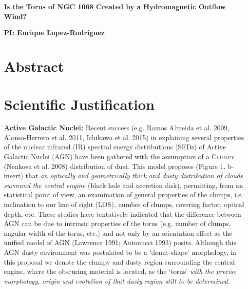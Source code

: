 \documentclass[12pt,a4paper]{article}  %
\begin{document}
\pagestyle{plain}
 

\begin{center}
{\LARGE{\bf
{Is the Torus of NGC 1068 Created by a Hydromagnetic Outflow Wind?}
}}
\end{center}
\bigskip

\centerline{\bf PI: 
{Enrique Lopez-Rodriguez}}

\bigskip


\section{Abstract}




\section{Scientific Justification}

\textbf{Active Galactic Nuclei:} Recent success (e.g. Ramos Almeida et al. 2009, Alonso-Herrero et al. 2011, Ichikawa et al. 2015) in explaining several properties of the nuclear infrared (IR) spectral energy distributions (SEDs) of Active Galactic Nuclei (AGN) have been gathered with the assumption of a \textsc{Clumpy} (Nenkova et al. 2008) distribution of dust. This model proposes (Figure 1, b-insert) that \textit{an optically and geometrically thick and dusty distribution of clouds surround the central engine} (black hole and accretion disk), permitting, from an statistical point of view, an examination of general properties of the clumps, i.e. inclination to our line of sight (LOS), number of clumps, covering factor, optical depth, etc. These studies have tentatively indicated that the difference between AGN can be due to intrinsic properties of the torus (e.g. number of clumps, angular width of the torus, etc.) and not only by an orientation effect as the unified model of AGN (Lawrence 1991; Antonucci 1993) posits. Although this AGN dusty environment was postulated to be a `donut-shape' morphology, in this proposal we denote the clumpy and dusty region surrounding the central engine, where the obscuring material is located, as the `torus' \textit{with the precise morphology, origin and evolution of that dusty region still to be determined.}  
\end{document}
